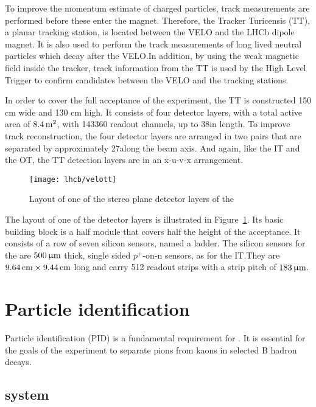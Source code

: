 To improve the momentum estimate of charged particles, track measurements are
performed before these enter the magnet. Therefore, the Tracker Turicensis
(TT), a planar tracking station, is located between the VELO and the LHCb
dipole magnet. It is also used to perform the track measurements of long lived
neutral particles which decay after the VELO.\@ In addition, by using the weak
magnetic field inside the tracker, track information from the TT is used by the
High Level Trigger to confirm candidates between the VELO and the tracking
stations.

In order to cover the full acceptance of the experiment, the TT is constructed
150 cm wide and 130 cm high. It consists of four detector layers, with a total
active area of $8.4\rm \,m^2$, with 143360 readout channels, up to 38\cm in length.
To improve track reconstruction, the four detector layers are arranged in two
pairs that are separated by approximately 27\cm along the \lhcb beam axis. And
again, like the IT and the OT, the TT detection layers are in an x-u-v-x
arrangement.

\begin{figure}[tb]
\begin{center}
\texttt{[image: lhcb/velott]}
\end{center}
\caption{\small Layout of one of the stereo plane detector layers of the \ttracker}
\label{fig:velott}
\end{figure}


The layout of one of the detector layers is illustrated in
Figure~\ref{fig:velott}. Its basic building block is a half module that covers
half the height of the \lhcb acceptance. It consists of a row of seven silicon
sensors, named a ladder. The silicon sensors for the \ttracker are $500{\,\upmu\rm m}$
thick, single sided $p^+$-on-n sensors, as for the IT.\@ They are
$9.64\rm \,cm\times9.44\rm \,cm$ long and carry 512 readout strips with a strip pitch of
$183{\,\upmu\rm m}$.

\section{Particle identification}

Particle identiﬁcation (PID) is a fundamental requirement for \lhcb. It is
essential for the goals of the experiment to separate pions from kaons in
selected B hadron decays.

\subsection{\rich system}

